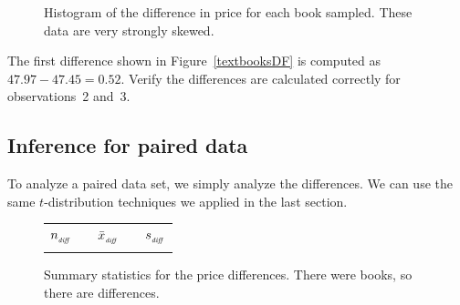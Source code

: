 \begin{figure}
  \centering
  \caption{Histogram of the difference in price for
      each book sampled.
      These data are very strongly skewed.
      }
  \label{diffInTextbookPricesF18}
\end{figure}

\begin{exercisewrap}
\begin{nexercise}
The first difference shown in Figure~\ref{textbooksDF}
is computed as $47.97 - 47.45 = 0.52$.
Verify the differences are calculated correctly for
observations~2 and~3.\footnotemark{}
\end{nexercise}
\end{exercisewrap}


\subsection{Inference for paired data}

To analyze a paired data set,
we simply analyze the differences.
We can use the same $t$-distribution techniques
we applied in the last section.

\begin{figure}[hh]
\centering
\begin{tabular}{ccccc}
\hline
$n_{_{\text{\emph{diff}}}}$	&\hspace{3mm}& $\bar{x}_{_{\text{\emph{diff}}}}$	&\hspace{3mm}& $s_{_{\text{\emph{diff}}}}$ \vspace{1mm}\\
\uclabookN{}  && \uclabookM{}  && \uclabookSD{} \\
\hline
\end{tabular}
\caption{Summary statistics for the price differences.
    There were \uclabookN{} books, so there are \uclabookN{}
    differences.}
\label{textbooksSummaryStats}
\end{figure}


